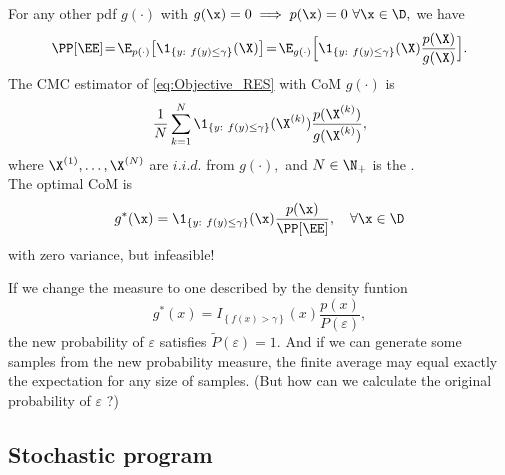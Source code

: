       For any other pdf $g(\cdot)$ with $g(\x)=0\implies p(\x)=0\ \forall \x \in \D,$ we have
      \begin{equation}\label{eq:CoM_RES}
            \PP[\EE]\!=\!\E_{p(\cdot)}\big[\1_{\{y:\ f(y)\le \gamma\}}(\X)\big] \!=\!\E_{g(\cdot)}\Big[\1_{\{y:\ f(y)\le \gamma\}}(\X)\frac{p(\X)}{g(\X)}\Big].
      \end{equation}
      The CMC estimator of \eqref{eq:Objective_RES} with CoM $g(\cdot)$ is
      \begin{equation}\label{eq:CoM_CMC}
            \frac{1}{N} \sum_{k=1}^{N} \1_{\{y:\ f(y)\le \gamma\}}(\X^{(k)})\frac{p(\X^{(k)})}{g(\X^{(k)})},
      \end{equation}
      where $\X^{(1)}, \ldots, \X^{(N)}$ are $i.i.d.$ from $g(\cdot),$ 
      and $N\in \N_+$ is the .\\ 
      The optimal CoM is 
      \begin{equation}\label{eq:OptCoM_RES}
                  g^*(\x)=\1_{\{y:\ f(y)\le \gamma\}}(\x) \frac{p(\x)}{\PP[\EE]}, \quad \forall \x \in \D
      \end{equation}
      with zero variance, but infeasible!

\begin{note}
      If we change the measure to one described by the density funtion
      $$ g^*(x) = I_{\left\{f(x) > \gamma\right\}}\left(x\right) \frac{p\left(x\right)}{P\left(\varepsilon\right)}, $$
      the new probability of $\varepsilon$ satisfies $\tilde P (\varepsilon) = 1$.
      And if we can generate some samples from the new probability measure, the finite average may equal exactly the expectation
      for any size of samples. (But how can we calculate the original probability of $\varepsilon$ ?)
\end{note}

      \subsection{Stochastic program}

